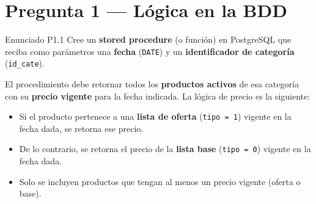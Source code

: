 \documentclass[12pt,a4paper]{article}
\begin{document}
\begin{center}
\end{center}

\newpage

\section*{Pregunta 1 --- Lógica en la BDD}

\begin{enunciadobox}{Enunciado P1.1}
Cree un \textbf{stored procedure} (o función) en PostgreSQL que reciba como
parámetros una \textbf{fecha} (\texttt{DATE}) y un \textbf{identificador de
categoría} (\texttt{id\_cate}).

El procedimiento debe retornar todos los \textbf{productos activos} de esa
categoría con su \textbf{precio vigente} para la fecha indicada.
La lógica de precio es la siguiente:
\begin{itemize}[leftmargin=2em,itemsep=2pt]
  \item Si el producto pertenece a una \textbf{lista de oferta} (\texttt{tipo = 1})
        vigente en la fecha dada, se retorna ese precio.
  \item De lo contrario, se retorna el precio de la \textbf{lista base}
        (\texttt{tipo = 0}) vigente en la fecha dada.
  \item Solo se incluyen productos que tengan al menos un precio vigente
        (oferta o base).
\end{itemize}
\end{enunciadobox}
\end{document}
